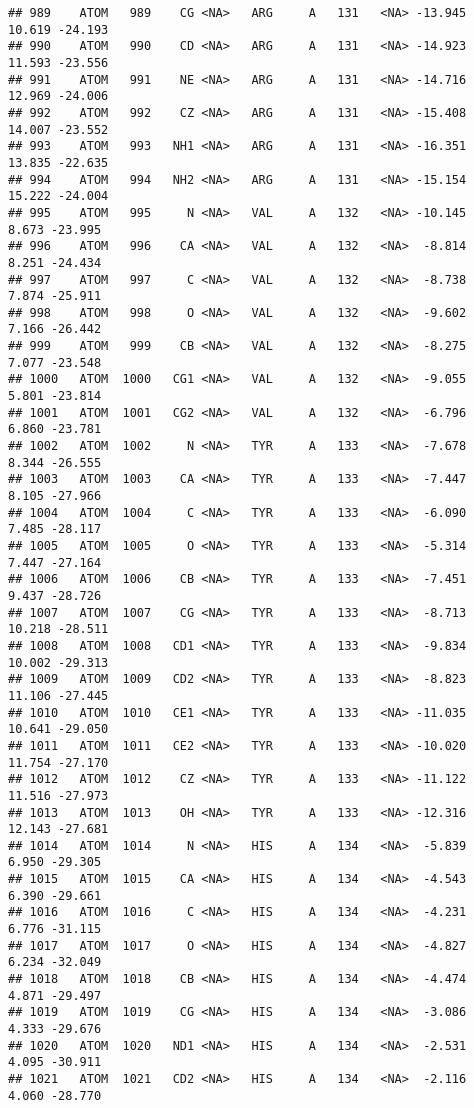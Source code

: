 \documentclass[
]{article}
\begin{document}
\begin{verbatim}
## 989    ATOM   989    CG <NA>   ARG     A   131   <NA> -13.945  10.619 -24.193
## 990    ATOM   990    CD <NA>   ARG     A   131   <NA> -14.923  11.593 -23.556
## 991    ATOM   991    NE <NA>   ARG     A   131   <NA> -14.716  12.969 -24.006
## 992    ATOM   992    CZ <NA>   ARG     A   131   <NA> -15.408  14.007 -23.552
## 993    ATOM   993   NH1 <NA>   ARG     A   131   <NA> -16.351  13.835 -22.635
## 994    ATOM   994   NH2 <NA>   ARG     A   131   <NA> -15.154  15.222 -24.004
## 995    ATOM   995     N <NA>   VAL     A   132   <NA> -10.145   8.673 -23.995
## 996    ATOM   996    CA <NA>   VAL     A   132   <NA>  -8.814   8.251 -24.434
## 997    ATOM   997     C <NA>   VAL     A   132   <NA>  -8.738   7.874 -25.911
## 998    ATOM   998     O <NA>   VAL     A   132   <NA>  -9.602   7.166 -26.442
## 999    ATOM   999    CB <NA>   VAL     A   132   <NA>  -8.275   7.077 -23.548
## 1000   ATOM  1000   CG1 <NA>   VAL     A   132   <NA>  -9.055   5.801 -23.814
## 1001   ATOM  1001   CG2 <NA>   VAL     A   132   <NA>  -6.796   6.860 -23.781
## 1002   ATOM  1002     N <NA>   TYR     A   133   <NA>  -7.678   8.344 -26.555
## 1003   ATOM  1003    CA <NA>   TYR     A   133   <NA>  -7.447   8.105 -27.966
## 1004   ATOM  1004     C <NA>   TYR     A   133   <NA>  -6.090   7.485 -28.117
## 1005   ATOM  1005     O <NA>   TYR     A   133   <NA>  -5.314   7.447 -27.164
## 1006   ATOM  1006    CB <NA>   TYR     A   133   <NA>  -7.451   9.437 -28.726
## 1007   ATOM  1007    CG <NA>   TYR     A   133   <NA>  -8.713  10.218 -28.511
## 1008   ATOM  1008   CD1 <NA>   TYR     A   133   <NA>  -9.834  10.002 -29.313
## 1009   ATOM  1009   CD2 <NA>   TYR     A   133   <NA>  -8.823  11.106 -27.445
## 1010   ATOM  1010   CE1 <NA>   TYR     A   133   <NA> -11.035  10.641 -29.050
## 1011   ATOM  1011   CE2 <NA>   TYR     A   133   <NA> -10.020  11.754 -27.170
## 1012   ATOM  1012    CZ <NA>   TYR     A   133   <NA> -11.122  11.516 -27.973
## 1013   ATOM  1013    OH <NA>   TYR     A   133   <NA> -12.316  12.143 -27.681
## 1014   ATOM  1014     N <NA>   HIS     A   134   <NA>  -5.839   6.950 -29.305
## 1015   ATOM  1015    CA <NA>   HIS     A   134   <NA>  -4.543   6.390 -29.661
## 1016   ATOM  1016     C <NA>   HIS     A   134   <NA>  -4.231   6.776 -31.115
## 1017   ATOM  1017     O <NA>   HIS     A   134   <NA>  -4.827   6.234 -32.049
## 1018   ATOM  1018    CB <NA>   HIS     A   134   <NA>  -4.474   4.871 -29.497
## 1019   ATOM  1019    CG <NA>   HIS     A   134   <NA>  -3.086   4.333 -29.676
## 1020   ATOM  1020   ND1 <NA>   HIS     A   134   <NA>  -2.531   4.095 -30.911
## 1021   ATOM  1021   CD2 <NA>   HIS     A   134   <NA>  -2.116   4.060 -28.770

\end{verbatim}
\end{document}

